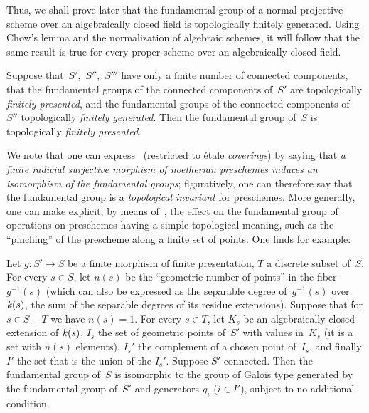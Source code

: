 Thus,
we shall prove later that the fundamental group of a normal
projective scheme over an algebraically closed field is topologically
finitely generated. Using Chow's lemma and the normalization of
algebraic schemes, it will follow that the same result is true for
every proper scheme over an algebraically closed field.

\begin{corollary}
\label{IX.5.3}
Suppose that~$S'$,~$S''$,~$S'''$ have only a finite number of
connected components, that the fundamental groups of the connected
components of~$S'$ are topologically \emph{finitely presented}, and
the fundamental groups of the connected components of~$S''$
topologically \emph{finitely generated}. Then the fundamental group
of~$S$ is topologically \emph{finitely presented}.
\end{corollary}

We note that one can express~ (restricted to étale
\emph{coverings}) by saying that \emph{a finite radicial surjective
morphism of noetherian preschemes induces an isomorphism of the
fundamental groups}; figuratively, one can therefore say that the
fundamental group is a \emph{topological invariant} for preschemes.
More generally, one can make explicit, by means of~, the
effect on the fundamental group of operations on preschemes having a
simple topological meaning, such as the ``pinching'' of the prescheme
along a finite set of points. One finds for example:

\begin{corollary}
\label{IX.5.4}
Let $g\colon S'\to S$ be a finite morphism of finite presentation,
$T$ a discrete subset of~$S$. For every $s\in S$, let $n(s)$ be the
``geometric number of points'' in the fiber $g^{-1}(s)$ (which can
also be expressed as the separable degree of~$g^{-1}(s)$
over~$\mathit{k}(s)$, the sum of the separable degrees of its residue
extensions). Suppose that for $s\in S-T$ we have $n(s)=1$. For every
$s\in T$, let $K_s$ be an algebraically closed extension of
$\mathit{k}(s)$, $I_s$ the set of geometric points of~$S'$ with values
in~$K_s$ (it is a set with $n(s)$ elements), $I_s'$ the complement of
a chosen point of~$I_s$, and finally $I'$ the set that is the union of
the $I_s'$. Suppose $S'$ connected. Then the fundamental group of~$S$
is isomorphic to the group of Galois type generated by the
fundamental group of~$S'$ and generators $g_i$ ($i\in I'$), subject to
no additional condition.
\end{corollary}

